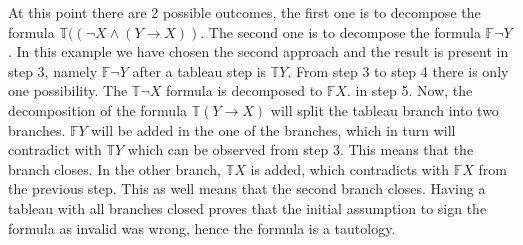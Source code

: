 \documentclass{article}
\newcommand{\signT}{\mathbb{T}}
\newcommand{\signF}{\mathbb{F}}
\begin{document}
At this point there are 2 possible outcomes, the first one is to decompose the formula $\signT ((\neg X \wedge (Y \rightarrow X))$. The second one is to decompose the formula $\signF\neg Y$. In this example we have chosen the second approach and the result is present in step 3, namely $\signF\neg Y$ after a tableau step is $\signT Y$. From step 3 to step 4 there is only one possibility. The $\signT\neg X$ formula is decomposed to $\signF X$. in step 5. Now, the decomposition of the formula $\signT (Y \rightarrow X)$ will split the tableau branch into two branches. $\signF Y$ will be added in the one of the branches, which in turn will contradict with $\signT Y$ which can be observed from step 3. This means that the branch closes. In the other branch, $\signT X$ is added, which contradicts with $\signF X$ from the previous step. This as well means that the second branch closes. Having a tableau with all branches closed proves that the initial assumption to sign the formula as invalid was wrong, hence the formula is a tautology.
	\newline
\end{document}
